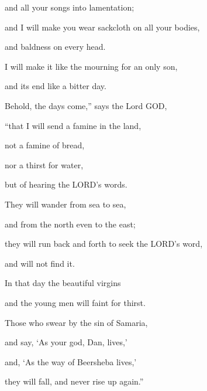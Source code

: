 	and all your songs into lamentation;
	
	and I will make you wear sackcloth on all your bodies,
	
	and baldness on every head.
	
	I will make it like the mourning for an only son,
	
	and its end like a bitter day.
	
	\myverse{}Behold, the days come,” says the Lord GOD,
	
	“that I will send a famine in the land,
	
	not a famine of bread,
	
	nor a thirst for water,
	
	but of hearing the LORD’s words.
	
	\myverse{}They will wander from sea to sea,
	
	and from the north even to the east;
	
	they will run back and forth to seek the LORD’s word,
	
	and will not find it.
	
	\myverse{}In that day the beautiful virgins
	
	and the young men will faint for thirst.
	
	\myverse{}Those who swear by the sin of Samaria,
	
	and say, ‘As your god, Dan, lives,’
	
	and, ‘As the way of Beersheba lives,’
	
	they will fall, and never rise up again.”
	
